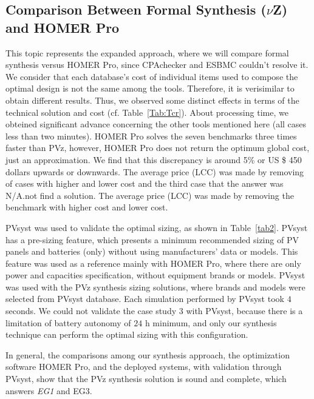\documentclass[review]{elsarticle}
\begin{document}
\subsection{Comparison Between Formal Synthesis ($\nu$Z) and HOMER Pro}
  
This topic represents the expanded approach, where we will compare formal synthesis versus HOMER Pro, since CPAchecker and ESBMC couldn't resolve it. We consider that each database's cost of individual items used to compose the optimal design is not the same among the tools. Therefore, it is verisimilar to obtain different results. Thus, we observed some distinct effects in terms of the technical solution and cost (cf. Table~\ref{Tab:Tcr}). About processing time, we obteined significant advance concerning the other tools mentioned here (all cases less than two minutes). HOMER Pro solves the seven benchmarks three times faster than PVz, however, HOMER Pro does not return the optimum global cost, just an approximation. We find that this discrepancy is around 5\% or US \$ 450 dollars upwards or downwards. The average price (LCC) was made by removing of cases with higher and lower cost and the third case that the answer was N/A.not find a solution. The average price (LCC) was made by removing the benchmark with higher cost and lower cost.

PVsyst was used to validate the optimal sizing, as shown in Table~\ref{tab2}. PVsyst has a pre-sizing feature, which presents a minimum recommended sizing of PV panels and batteries (only) without using manufacturers' data or models. This feature was used as a reference mainly with HOMER Pro, where there are only power and capacities specification, without equipment brands or models.  PVsyst was used with the PVz synthesis sizing solutions, where brands and models were selected from PVsyst database. Each simulation performed by PVsyst took $4$ seconds. We could not validate the case study $3$ with PVsyst, because there is a limitation of battery autonomy of $24$ h minimum, and only our synthesis technique can perform the optimal sizing with this configuration.

In general, the comparisons among our synthesis approach, the optimization software HOMER Pro, and the deployed systems, with validation through PVsyst, show that the PVz synthesis solution is sound and complete, which answers \textit{EG1} and {EG3}.
\end{document}
